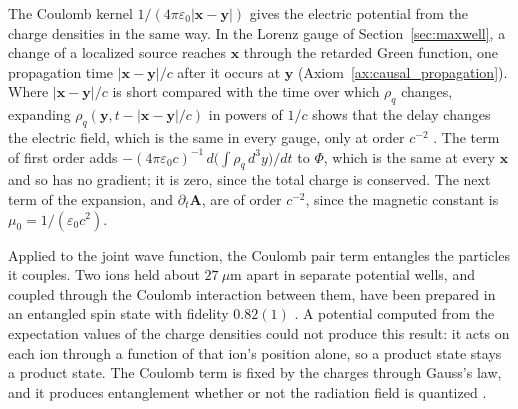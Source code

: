 \documentclass[aps,prd,onecolumn,tightenlines,nofootinbib,notitlepage,11pt,floatfix]{revtex4-2}
\theoremstyle{indentedtheorem}
\begin{document}
The Coulomb kernel $1/(4\pi\varepsilon_0|\mathbf{x}-\mathbf{y}|)$ gives the electric potential from the charge densities in the same way. In the Lorenz gauge of Section~\ref{sec:maxwell}, a change of a localized source reaches $\mathbf{x}$ through the retarded Green function, one propagation time $|\mathbf{x}-\mathbf{y}|/c$ after it occurs at $\mathbf{y}$ (Axiom~\ref{ax:causal_propagation}). Where $|\mathbf{x}-\mathbf{y}|/c$ is short compared with the time over which $\rho_q$ changes, expanding $\rho_q(\mathbf{y},t-|\mathbf{x}-\mathbf{y}|/c)$ in powers of $1/c$ shows that the delay changes the electric field, which is the same in every gauge, only at order $c^{-2}$ \citep{Jackson1999Classical,LandauLifshitz1975Classical}. The term of first order adds $-(4\pi\varepsilon_0c)^{-1}\,d\big(\int\rho_q\,d^3y\big)/dt$ to $\Phi$, which is the same at every $\mathbf{x}$ and so has no gradient; it is zero, since the total charge is conserved. The next term of the expansion, and $\partial_t\mathbf{A}$, are of order $c^{-2}$, since the magnetic constant is $\mu_0=1/(\varepsilon_0c^2)$.

Applied to the joint wave function, the Coulomb pair term entangles the particles it couples. Two ions held about $27~\mu\text{m}$ apart in separate potential wells, and coupled through the Coulomb interaction between them, have been prepared in an entangled spin state with fidelity $0.82(1)$ \citep{Wilson2014Tunable}. A potential computed from the expectation values of the charge densities could not produce this result: it acts on each ion through a function of that ion's position alone, so a product state stays a product state. The Coulomb term is fixed by the charges through Gauss's law, and it produces entanglement whether or not the radiation field is quantized \citep{Anastopoulos2018Comment}.
\end{document}
